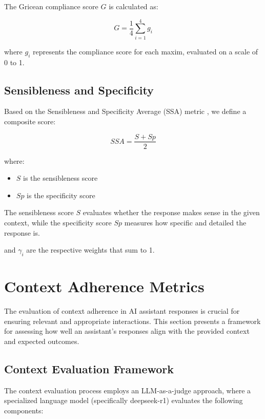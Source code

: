\documentclass[12pt]{article}
\begin{document}
The Gricean compliance score $G$ is calculated as:

\begin{equation}
    G = \frac{1}{4}\sum_{i=1}^{4} g_i
\end{equation}

where $g_i$ represents the compliance score for each maxim, evaluated on a scale of 0 to 1.

\subsection{Sensibleness and Specificity}

Based on the Sensibleness and Specificity Average (SSA) metric \cite{adolphs2020evaluation}, we define a composite score:

\begin{equation}
    SSA = \frac{S + Sp}{2}
\end{equation}

where:
\begin{itemize}
    \item $S$ is the sensibleness score
    \item $Sp$ is the specificity score
\end{itemize}

The sensibleness score $S$ evaluates whether the response makes sense in the given context, while the specificity score $Sp$ measures how specific and detailed the response is.


and $\gamma_i$ are the respective weights that sum to 1.

\section{Context Adherence Metrics}

The evaluation of context adherence in AI assistant responses is crucial for ensuring relevant and appropriate interactions. This section presents a framework for assessing how well an assistant's responses align with the provided context and expected outcomes.

\subsection{Context Evaluation Framework}

The context evaluation process employs an LLM-as-a-judge approach, where a specialized language model (specifically deepseek-r1) evaluates the following components:
\end{document}
